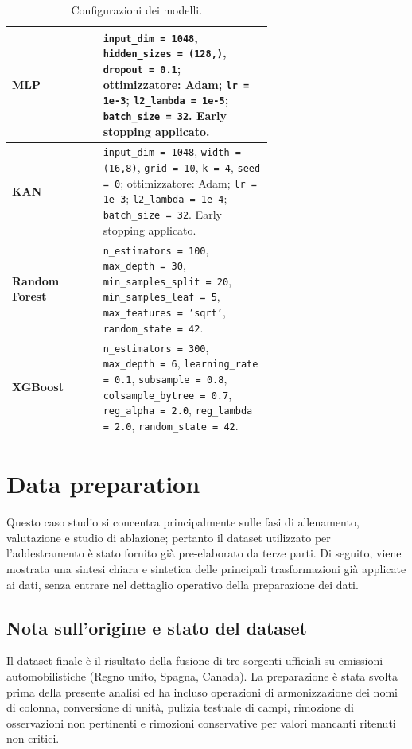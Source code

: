 \documentclass[a4paper,12pt]{report}
\begin{document}
	\begin{table}[H]
		\centering
		\caption{Configurazioni dei modelli.}
		\label{tab:model-config}
		\begin{tabular}{l p{0.65\linewidth}}
			\toprule
			\textbf{MLP} & \texttt{input\_dim = 1048}, \texttt{hidden\_sizes = (128,)}, \texttt{dropout = 0.1}; ottimizzatore: Adam; \texttt{lr = 1e-3}; \texttt{l2\_lambda = 1e-5}; \texttt{batch\_size = 32}. Early stopping applicato. \\
			\midrule
			\textbf{KAN} & \texttt{input\_dim = 1048}, \texttt{width = (16,8)}, \texttt{grid = 10}, \texttt{k = 4}, \texttt{seed = 0}; ottimizzatore: Adam; \texttt{lr = 1e-3}; \texttt{l2\_lambda = 1e-4}; \texttt{batch\_size = 32}. Early stopping applicato. \\
			\midrule
			\textbf{Random Forest} & \texttt{n\_estimators = 100}, \texttt{max\_depth = 30}, \texttt{min\_samples\_split = 20}, \texttt{min\_samples\_leaf = 5}, \texttt{max\_features = 'sqrt'}, \texttt{random\_state = 42}. \\
			\midrule
			\textbf{XGBoost} & \texttt{n\_estimators = 300}, \texttt{max\_depth = 6}, \texttt{learning\_rate = 0.1}, \texttt{subsample = 0.8}, \texttt{colsample\_bytree = 0.7}, \texttt{reg\_alpha = 2.0}, \texttt{reg\_lambda = 2.0}, \texttt{random\_state = 42}. \\
			\bottomrule
		\end{tabular}
	\end{table}
	
	\section{Data preparation}
	
	Questo caso studio si concentra principalmente sulle fasi di allenamento, valutazione e studio di ablazione; pertanto il dataset utilizzato per l'addestramento è stato fornito già pre-elaborato da terze parti. Di seguito, viene mostrata una sintesi chiara e sintetica delle principali trasformazioni già applicate ai dati, senza entrare nel dettaglio operativo della preparazione dei dati.
	
	\subsection{Nota sull'origine e stato del dataset}
	Il dataset finale è il risultato della fusione di tre sorgenti ufficiali su emissioni automobilistiche (Regno unito, Spagna, Canada). La preparazione è stata svolta prima della presente analisi ed ha incluso operazioni di armonizzazione dei nomi di colonna, conversione di unità, pulizia testuale di campi, rimozione di osservazioni non pertinenti e rimozioni conservative per valori mancanti ritenuti non critici.
	
\end{document}

